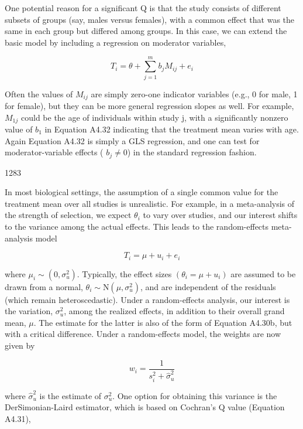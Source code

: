 \documentclass{article}
\begin{document}
One potential reason for a significant Q is that the study consists of different subsets of groups (say, males versus females), with a common effect that was the same in each group but differed among groups. In this case, we can extend the basic model by including a regression on moderator variables,

\begin{equation}
T_{i}=\theta+\sum_{j=1}^{m}b_{j}M_{ij}+e_{i}
\end{equation}

Often the values of  $ M_{ij} $ are simply zero-one indicator variables (e.g., 0 for male, 1 for female), but they can be more general regression slopes as well. For example,  $ M_{1j} $ could be the age of individuals within study j, with a significantly nonzero value of  $ b_1 $ in Equation A4.32 indicating that the treatment mean varies with age. Again Equation A4.32 is simply a GLS regression, and one can test for moderator-variable effects ( $ b_j \neq 0 $) in the standard regression fashion.

1283

In most biological settings, the assumption of a single common value for the treatment mean over all studies is unrealistic. For example, in a meta-analysis of the strength of selection, we expect  $ \theta_{i} $ to vary over studies, and our interest shifts to the variance among the actual effects. This leads to the random-effects meta-analysis model

\begin{equation}
T_{i}=\mu+u_{i}+e_{i}
\end{equation}

where  $ \mu_i \sim (0, \sigma_u^2) $. Typically, the effect sizes  $ (\theta_i = \mu + u_i) $ are assumed to be drawn from a normal,  $ \theta_i \sim \mathrm{N}(\mu, \sigma_u^2) $, and are independent of the residuals (which remain heteroscedastic). Under a random-effects analysis, our interest is the variation,  $ \sigma_u^2 $, among the realized effects, in addition to their overall grand mean,  $ \mu $. The estimate for the latter is also of the form of Equation A4.30b, but with a critical difference. Under a random-effects model, the weights are now given by

\begin{equation}
w_{i}=\frac{1}{s_{i}^{2}+\widehat{\sigma}_{u}^{2}}
\end{equation}

where  $ \widehat{\sigma}_{u}^{2} $ is the estimate of  $ \sigma_{u}^{2} $. One option for obtaining this variance is the DerSimonian-Laird estimator, which is based on Cochran's Q value (Equation A4.31),
\end{document}
